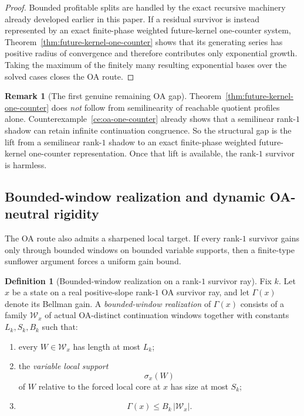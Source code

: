 \documentclass[11pt]{article}
\theoremstyle{definition}
\newtheorem{definition}[theorem]{Definition}
\newtheorem{remark}[theorem]{Remark}
\newcommand{\1}{\mathbf{1}}
\begin{document}
\begin{proof}
Bounded profitable splits are handled by the exact recursive machinery already developed earlier in this paper.
If a residual survivor is instead represented by an exact finite-phase weighted future-kernel one-counter system, Theorem~\ref{thm:future-kernel-one-counter} shows that its generating series has positive radius of convergence and therefore contributes only exponential growth.
Taking the maximum of the finitely many resulting exponential bases over the solved cases closes the OA route.
\end{proof}

\begin{remark}[The first genuine remaining OA gap]\label{rem:future-kernel-gap}
Theorem~\ref{thm:future-kernel-one-counter} does \emph{not} follow from semilinearity of reachable quotient profiles alone.
Counterexample~\ref{ce:oa-one-counter} already shows that a semilinear rank-$1$ shadow can retain infinite continuation congruence.
So the structural gap is the lift from a semilinear rank-$1$ shadow to an exact finite-phase weighted future-kernel one-counter representation.
Once that lift is available, the rank-$1$ survivor is harmless.
\end{remark}





\subsection*{Bounded-window realization and dynamic OA-neutral rigidity}
The OA route also admits a sharpened local target. If every rank-$1$ survivor gains only through bounded windows on bounded variable supports, then a finite-type sunflower argument forces a uniform gain bound.

\begin{definition}[Bounded-window realization on a rank-$1$ survivor ray]\label{def:oa-window-realization}
Fix $k$. Let $x$ be a state on a real positive-slope rank-$1$ OA survivor ray, and let $\Gamma(x)$ denote its Bellman gain. A \emph{bounded-window realization} of $\Gamma(x)$ consists of a family $\mathcal W_x$ of actual OA-distinct continuation windows together with constants $L_k,S_k,B_k$ such that:
\begin{enumerate}[label=(\roman*),leftmargin=2.2em]
\item every $W\in \mathcal W_x$ has length at most $L_k$;
\item the \emph{variable local support}
\[
\sigma_x(W)
\]
of $W$ relative to the forced local core at $x$ has size at most $S_k$;
\item
\[
\Gamma(x)\le B_k\,|\mathcal W_x|.
\]
\end{enumerate}
\end{definition}
\end{document}
